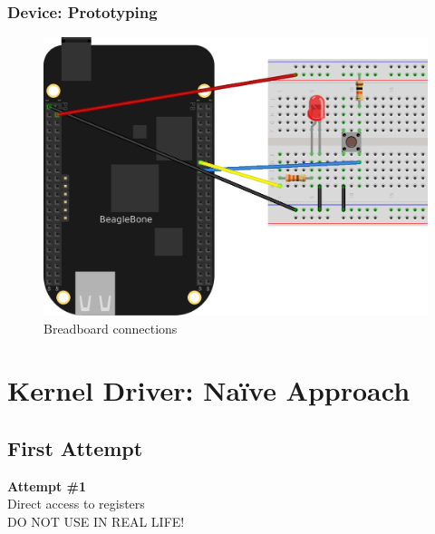 \documentclass[aspectratio=169,usenames,dvipsnames]{beamer}
\begin{document}
\begin{frame}
  \frametitle{Device: Prototyping}
    \begin{figure}
      \centering
      \includegraphics[scale=0.7]{images/lab1_bb.png}
      \caption{Breadboard connections}
  \end{figure}
  \vspace*{-12mm}
\end{frame}

\section{Kernel Driver: Na\"ive Approach}

\subsection{First Attempt}

\begin{frame}[standout]
  \textbf{Attempt \#1} \\
  \vspace{5mm}
  Direct access to registers \\
  \vspace{5mm}
  \alert{DO NOT USE IN REAL LIFE!}
\end{frame}
\end{document}

